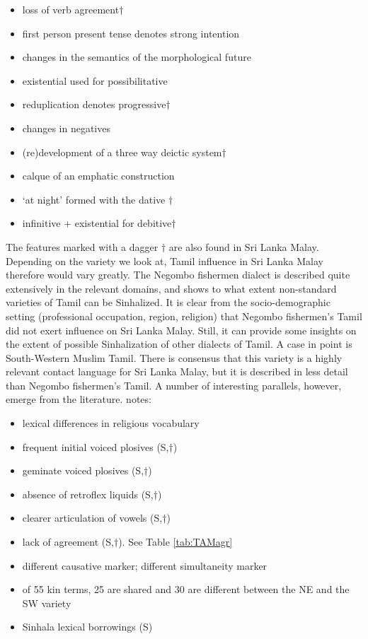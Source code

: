 \documentclass{article}
\begin{document}
\begin{itemize}
 \item loss of verb agreement{$\dag$}
 \item first person present tense denotes strong intention
 \item changes in the semantics of the morphological future 
 \item existential used for possibilitative 
 \item reduplication denotes progressive{$\dag$}
 \item changes in negatives
 \item (re)development of a three way deictic system{$\dag$}
 \item calque of an emphatic construction 
 \item `at night' formed with the dative {$\dag$}
 \item infinitive + existential for debitive{$\dag$}           
\end{itemize}

The features marked with a dagger {$\dag$} are also found in Sri Lanka Malay. Depending on the variety we look at, Tamil influence in Sri Lanka Malay therefore would vary greatly. The Negombo fishermen dialect is described quite extensively in the relevant domains, and shows to what extent non-standard varieties of Tamil can be Sinhalized. It is clear from the socio-demographic setting (professional occupation, region, religion) that Negombo fishermen's Tamil did not exert influence on Sri Lanka Malay. Still, it can provide some insights on the extent of possible Sinhalization of other dialects of Tamil. A case in point is South-Western Muslim Tamil. There is consensus that this variety is a highly relevant contact language for Sri Lanka Malay, but it is described in less detail than Negombo fishermen's Tamil. A number of interesting parallels, however, emerge from the literature. \citet[72-79]{Nuhman2007} notes:

\begin{itemize} 
 \item lexical differences in religious vocabulary
 \item frequent initial voiced plosives (S,{$\dag$})
 \item geminate voiced plosives (S,{$\dag$})
 \item absence of retroflex liquids (S,{$\dag$})
 \item clearer articulation of vowels (S,{$\dag$})
 \item lack of agreement (S,{$\dag$}). See Table \ref{tab:TAMagr}
 \item different causative marker; different simultaneity marker
 \item of 55 kin terms, 25 are shared and 30 are different between the NE and the SW variety 
 \item Sinhala lexical borrowings (S)
\end{itemize}
\end{document}
